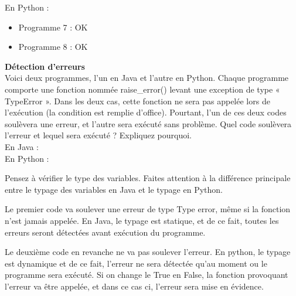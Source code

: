 \begin{Exercice}[5 minutes]
\begin{solution}
        En Python : \\
        
        \begin{itemize}
        	\item Programme 7 : OK
        	\item Programme 8 : OK
        \end{itemize}
        
        
    \end{solution}
\end{Exercice}

\begin{Exercice}[5 minutes] \textbf{Détection d'erreurs} \\

    Voici deux programmes, l’un en Java et l’autre en Python. Chaque programme comporte une fonction nommée raise\_error() levant une exception de type « TypeError ». Dans les deux cas, cette fonction ne sera pas appelée lors de l'exécution (la condition est remplie d’office). Pourtant, l’un de ces deux codes soulèvera une erreur, et l’autre sera exécuté sans problème. Quel code soulèvera l’erreur et lequel sera exécuté ? Expliquez pourquoi.\\
    
    En Java : \\
    
    
    
    En Python : \\
    
      
    
    
    \begin{conseil}
        Pensez à vérifier le type des variables. Faites attention à la différence principale entre le typage des variables en Java et le typage en Python.\\
    \end{conseil}
    \begin{solution}
    	Le premier code va soulever une erreur de type Type error, même si la fonction n'est jamais appelée. En Java, le typage est statique, et de ce fait, toutes les erreurs seront détectées avant exécution du programme.

Le deuxième code en revanche ne va pas soulever l'erreur. En python, le typage est dynamique et de ce fait, l'erreur ne sera détectée qu'au moment ou le programme sera exécuté. Si on change le True en False, la fonction provoquant l'erreur va être appelée, et dans ce cas ci, l'erreur sera mise en évidence.\\
    \end{solution}

\end{Exercice}
\newpage

